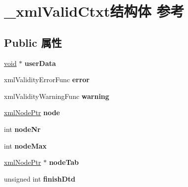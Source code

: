 \hypertarget{struct__xml_valid_ctxt}{}\section{\+\_\+xml\+Valid\+Ctxt结构体 参考}
\label{struct__xml_valid_ctxt}
\subsection*{Public 属性}
\begin{DoxyCompactItemize}
\item 
\mbox{\label{struct__xml_valid_ctxt_a669355aa1f3621673694e0860e4f78b5}} 
\hyperlink{interfacevoid}{void} $\ast$ {\bfseries user\+Data}
\item 
\mbox{\label{struct__xml_valid_ctxt_a67cb1147c3d53a4cb2920987b091ff7a}} 
xml\+Validity\+Error\+Func {\bfseries error}
\item 
\mbox{\label{struct__xml_valid_ctxt_af4ce21729ce719fd2c84e7c8d1f69413}} 
xml\+Validity\+Warning\+Func {\bfseries warning}
\item 
\mbox{\label{struct__xml_valid_ctxt_a3b3eca74a3d7965394d7cda4974e673a}} 
\hyperlink{struct__xml_node}{xml\+Node\+Ptr} {\bfseries node}
\item 
\mbox{\label{struct__xml_valid_ctxt_a22247258390f6c2d960e26d915aa8bcb}} 
int {\bfseries node\+Nr}
\item 
\mbox{\label{struct__xml_valid_ctxt_acb50c245f7c4afbdb5b5e6d56f108d97}} 
int {\bfseries node\+Max}
\item 
\mbox{\label{struct__xml_valid_ctxt_ac9084ffd1c5f9d43a8809177ef838810}} 
\hyperlink{struct__xml_node}{xml\+Node\+Ptr} $\ast$ {\bfseries node\+Tab}
\item 
\mbox{\label{struct__xml_valid_ctxt_a34ff820a3378c7742c09f6daeacd4db5}} 
unsigned int {\bfseries finish\+Dtd}
\item 
\mbox{\label{struct__xml_valid_ctxt_a1f084e858e3a50fa87696738c6d6a019}} 

\end{DoxyCompactItemize}
